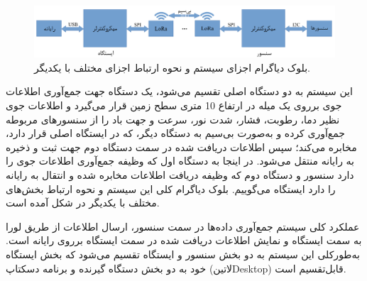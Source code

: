 
\begin{figure}[!h]
	\centering
	\includegraphics[width=\linewidth]{Assets/system design.pdf}
	\caption{بلوک دیاگرام اجزای سیستم و نحوه ارتباط اجزای مختلف با یکدیگر.}
	\label{fig:systemDesign}
\end{figure}
این سیستم به دو دستگاه اصلی تقسیم می‌شود، یک دستگاه جهت جمع‌آوری اطلاعات جوی برروی یک میله در ارتفاع 10 متری سطح زمین قرار می‌گیرد و اطلاعات جوی نظیر دما، رطوبت، فشار، شدت نور، سرعت و جهت باد را از سنسورهای مربوطه جمع‌آوری کرده و به‌صورت بی‌سیم به دستگاه دیگر، که در ایستگاه اصلی قرار دارد، مخابره می‌کند؛ سپس اطلاعات دریافت شده در سمت دستگاه دوم جهت ثبت و ذخیره به رایانه منتقل می‌شود. در اینجا به دستگاه اول که وظیفه جمع‌آوری اطلاعات جوی را دارد سنسور و دستگاه دوم که وظیفه دریافت اطلاعات مخابره شده و انتقال به رایانه را دارد ایستگاه می‌گوییم. بلوک دیاگرام کلی این سیستم و نحوه ارتباط بخش‌های مختلف با یکدیگر در شکل  آمده است.

عملکرد کلی سیستم جمع‌آوری داده‌ها در سمت سنسور، ارسال اطلاعات از طریق لورا به سمت ایستگاه و نمایش اطلاعات دریافت شده در سمت ایستگاه برروی رایانه است. به‌طورکلی این سیستم به دو بخش سنسور و ایستگاه تقسیم می‌شود که بخش ایستگاه خود به دو بخش دستگاه گیرنده و برنامه دسکتاپ (‌لاتین{Desktop}) قابل‌تقسیم است.


